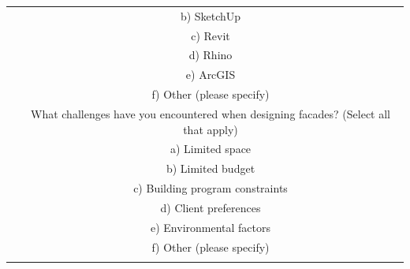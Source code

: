 \documentclass[final,5p,times]{elsarticle}
\begin{document}
\begin{table}[!htb]
\begin{tabular}{c c}
\begin{minipage}{.48\linewidth}
\begin{tabularx}{\linewidth}{p{0.125cm}X}
            & b) SketchUp \\
            & c) Revit \\
            & d) Rhino \\
            & e) ArcGIS \\
            & f) Other (please specify) \\
            \addlinespace
            5 & What challenges have you encountered when designing facades? (Select all that apply) \\
            & a) Limited space \\
            & b) Limited budget \\
            & c) Building program constraints \\
            & d) Client preferences \\
            & e) Environmental factors \\
            & f) Other (please specify) \\

            \bottomrule


\end{tabularx}
\end{minipage}
\end{tabular}
\end{table}
\end{document}
